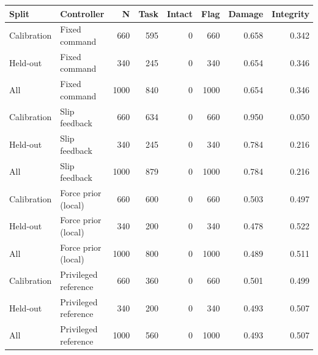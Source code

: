 \begin{tabular}{llrrrrrr}
\toprule
Split & Controller & N & Task & Intact & Flag & Damage & Integrity \\
\midrule
Calibration & Fixed command & 660 & 595 & 0 & 660 & 0.658 & 0.342 \\
Held-out & Fixed command & 340 & 245 & 0 & 340 & 0.654 & 0.346 \\
All & Fixed command & 1000 & 840 & 0 & 1000 & 0.654 & 0.346 \\
Calibration & Slip feedback & 660 & 634 & 0 & 660 & 0.950 & 0.050 \\
Held-out & Slip feedback & 340 & 245 & 0 & 340 & 0.784 & 0.216 \\
All & Slip feedback & 1000 & 879 & 0 & 1000 & 0.784 & 0.216 \\
Calibration & Force prior (local) & 660 & 600 & 0 & 660 & 0.503 & 0.497 \\
Held-out & Force prior (local) & 340 & 200 & 0 & 340 & 0.478 & 0.522 \\
All & Force prior (local) & 1000 & 800 & 0 & 1000 & 0.489 & 0.511 \\
Calibration & Privileged reference & 660 & 360 & 0 & 660 & 0.501 & 0.499 \\
Held-out & Privileged reference & 340 & 200 & 0 & 340 & 0.493 & 0.507 \\
All & Privileged reference & 1000 & 560 & 0 & 1000 & 0.493 & 0.507 \\
\bottomrule
\end{tabular}
